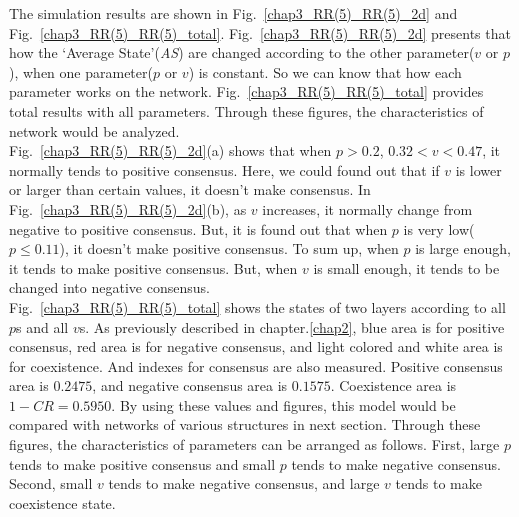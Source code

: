 The simulation results are shown in Fig.~\ref{chap3_RR(5)_RR(5)_2d} and Fig.~\ref{chap3_RR(5)_RR(5)_total}.  Fig.~\ref{chap3_RR(5)_RR(5)_2d} presents that how the `Average State'(\textit{AS}) are changed according to the other parameter($v$ or $p$), when one parameter($p$ or $v$) is constant. So we can know that how each parameter works on the network. Fig.~\ref{chap3_RR(5)_RR(5)_total} provides total results with all parameters. Through these figures, the characteristics of network would be analyzed.\\

Fig.~\ref{chap3_RR(5)_RR(5)_2d}(a) shows that when $p > 0.2$, $0.32 < v < 0.47$, it normally tends to positive consensus. Here, we could found out that if $v$ is lower or larger than certain values, it doesn't make consensus. In Fig.~\ref{chap3_RR(5)_RR(5)_2d}(b), as $v$ increases, it normally change from negative to positive consensus. But, it is found out that when $p$ is very low($p \le 0.11$), it doesn't make positive consensus.  To sum up, when $p$ is large enough, it tends to make positive consensus. But, when $v$ is small enough, it tends to be changed into negative consensus.\\

Fig.~\ref{chap3_RR(5)_RR(5)_total} shows the states of two layers according to all $p$s and all $v$s. As previously described in chapter.\ref{chap2}, blue area is for positive consensus, red area is for negative consensus, and light colored and white area is for coexistence. And indexes for consensus are also measured. Positive consensus area is $0.2475$, and negative consensus area is $0.1575$. Coexistence area is $1 - CR = 0.5950$. By using these values and figures, this model would be compared with networks of various structures in next section. Through these figures, the characteristics of parameters can be arranged as follows. First, large $p$ tends to make positive consensus and small $p$ tends to make negative consensus. Second, small $v$ tends to make negative consensus, and large $v$ tends to make coexistence state. \\

